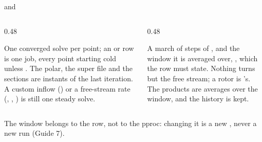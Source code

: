 \begin{frame}{ and }
\begin{columns}[T]
\begin{column}{0.48\textwidth}
\begin{block}{}
\small One converged solve per point; an  or
 row is one job, every point starting cold unless
. The polar, the super file and the sections are
instants of the last iteration. A custom inflow () or a
free-stream rate (, , )
is still one steady solve.
\end{block}
\end{column}
\begin{column}{0.48\textwidth}
\begin{block}{}
\small A march of  steps of , and
the window it is averaged over, , which the row must
state. Nothing turns but the free stream; a rotor is
's. The products are averages over the window, and the
history is kept.
\end{block}
\end{column}
\end{columns}
\begin{takeaway}The window belongs to the row, not to the pproc: changing it
is a new , never a new run (Guide 7).\end{takeaway}
\end{frame}

